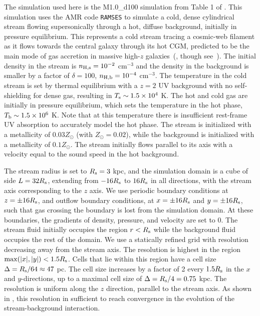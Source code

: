 \documentclass[fleqn,usenatbib]{mnras}
\begin{document}
The simulation used here is the M1.0\_d100 simulation from Table 1 of \cite{mandelker2020Instability}.
This simulation uses the AMR code \texttt{RAMSES} \citep{teyssier2002Cosmological} to simulate a cold, dense cylindrical stream flowing supersonically through a hot, diffuse background, initially in pressure equilibrium.
This represents a cold stream tracing a cosmic-web filament as it flows towards the central galaxy through its hot CGM, predicted to be the main mode of gas accretion in massive high-$z$ galaxies~(\citealt{keres2009Galaxies, dekel2009Cold}, though see~\citealt{nelson2013Moving}).
The initial density in the stream is $n_{\rm H,s}=10^{-2}$ cm$^{-3}$ and the density in the background is smaller by a factor of $\delta=100$, $n_{\rm H,b}=10^{-4}$ cm$^{-3}$.
The temperature in the cold stream is set by thermal equilibrium with a $z=2$ \cite{haardt1996Radiative} UV background with no self-shielding for dense gas, resulting in $T_{\rm s}\sim 1.5 \times 10^4$ K.
The hot and cold gas are initially in pressure equilibrium, which sets the temperature in the hot phase, $T_{\rm b}\sim 1.5 \times 10^6$ K.
Note that at this temperature there is insufficient rest-frame UV absorption to accurately model the hot phase.
The stream is initialized with a metallicity of $0.03 Z_\odot$ (with $Z_\odot = 0.02$), while the background is initialized with a metallicity of $0.1 Z_\odot$.
The stream initially flows parallel to its axis with a velocity equal to the sound speed in the hot background.

The stream radius is set to $R_{\rm s}=3$ kpc, and the simulation domain is a cube of side $L=32R_{\rm s}$, extending from $-16R_{\rm s}$ to $16R_{\rm s}$ in all directions, with the stream axis corresponding to the $z$ axis.
We use periodic boundary conditions at $z=\pm 16R_{\rm s}$, and outflow boundary conditions, at $x=\pm 16R_{\rm s}$ and $y=\pm 16R_{\rm s}$, such that gas crossing the boundary is lost from the simulation domain.
At these boundaries, the gradients of density, pressure, and velocity are set to 0.
The stream fluid initially occupies the region $r<R_{\rm s}$ while the background fluid occupies the rest of the domain.
We use a statically refined grid with resolution decreasing away from the stream axis.
The resolution is highest in the region ${\rm max}(|x|,|y|)<1.5R_{\rm s}$.
Cells that lie within this region have a cell size $\Delta=R_{\rm s}/64\approx 47$ pc.
The cell size increases by a factor of 2 every $1.5R_{\rm s}$ in the $x$ and $y$-directions, up to a maximal cell size of $\Delta=R_{\rm s}/4=0.75$ kpc.
The resolution is uniform along the $z$ direction, parallel to the stream axis.
As shown in \cite{mandelker2020Instability}, this resolution in sufficient to reach convergence in the evolution of the stream-background interaction.
\end{document}
